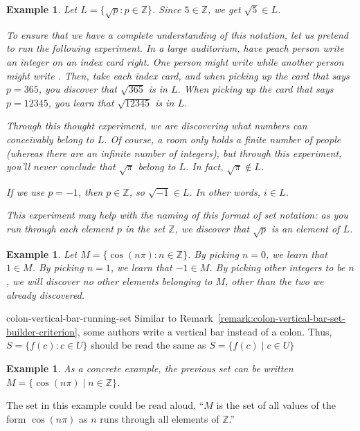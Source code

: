 \documentclass{book}
\newcounter{ekcounter}%
\theoremstyle{ekimcustom}
\newtheorem{example}[ekcounter]{Example}
\begin{document}
\begin{example}\label{example:Lsqrtp-with-pinZ}
Let $L = \{ \sqrt{p} : p \in \mathbb{Z}\}$. Since $5 \in \mathbb{Z}$, we get $\sqrt{5} \in L$.

To ensure that we have a complete understanding of this notation, let us pretend to run the following experiment. In a large auditorium, have peach person write an integer on an index card right. One person might write  while another person might write . Then, take each index card, and when picking up the card that says $p=365$, you discover that $\sqrt{365}$ is in $L$. When picking up the card that says $p=12345$, you learn that $\sqrt{12345}$ is in $L$.

Through this thought experiment, we are discovering what numbers can conceivably belong to $L$. Of course, a room only holds a finite number of people (whereas there are an infinite number of integers), but through this experiment, you'll never conclude that $\sqrt{\pi}$ belong to $L$. In fact, $\sqrt{\pi} \not\in L$.

If we use $p=-1$, then $p \in \mathbb{Z}$, so $\sqrt{-1} \in L$. In other words, $i \in L$.

This experiment may help with the naming of this format of set notation: as you run through each element $p$ in the set $\mathbb{Z}$, we discover that $\sqrt{p}$ is an element of $L$.
\end{example}

\begin{example}
Let $M = \{ \cos(n\pi) : n \in \mathbb{Z}\}$. By picking $n=0$, we learn that $1 \in M$. By picking $n=1$, we learn that $-1 \in M$. By picking other integers to be $n$, we will discover no other elements belonging to $M$, other than the two we already discovered.
\end{example}


\begin{bremark}{}{colon-vertical-bar-running-set}
Similar to Remark~\ref{remark:colon-vertical-bar-set-builder-criterion}, some authors write a vertical bar instead of a colon. Thus, $S = \{f(c) : c \in U\}$ should be read the same as $S = \{f(c) \mid c \in U\}$
\end{bremark}
\begin{example}\label{example:Mcosnpi}
As a concrete example, the previous set can be written $M = \{ \cos(n\pi) \mid n \in \mathbb{Z}\}$.
\end{example}
The set in this example could be read aloud, ``$M$ is the set of all values of the form $\cos(n\pi)$ as $n$ runs through all elements of $\mathbb{Z}$.''
\end{document}
